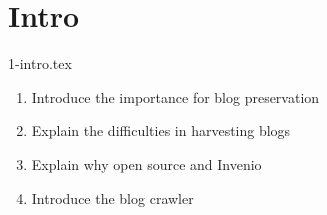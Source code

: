 \section{Intro}
1-intro.tex
\begin{enumerate}
  \item Introduce the importance for blog preservation
  \item Explain the difficulties in harvesting blogs
  \item Explain why open source and Invenio
  \item Introduce the blog crawler
\end{enumerate}

